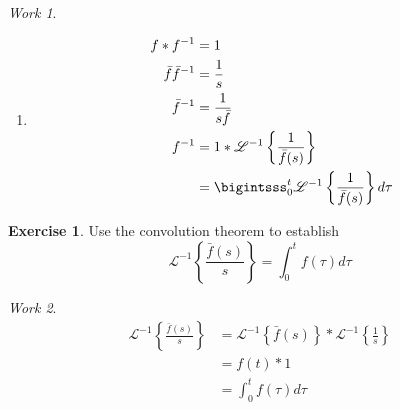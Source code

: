 \documentclass{report}
\theoremstyle{definition}
\newtheorem{exercise}{Exercise}[chapter]
\theoremstyle{remark}
\newtheorem*{work}{Work}
\newcommand{\inlt}[1]{\mathscr{L}^{-1} \left\{ #1 \right\}}
\begin{document}
\begin{work}
\begin{enumerate}[label=(\alph*)]
\begin{proof}
\begin{equation*}
\begin{split}
                &=\int^t_0h(x) (f*g)(x)dx \\
                &=h*(f*g)=(f*g)*h
            \end{split}
        \end{equation*}
        \end{proof}
        \item \begin{equation*}
            \begin{split}
                f*f^{-1}&=1\\
                \bar f \bar f^{-1} &=\frac{1}{s}\\
                \bar f^{-1} &=\frac{1}{s\bar f} \\ 
                f^{-1} &= 1*\inlt{\frac{1}{\bar f(s)}} \\
                &=\bigintsss_0^t\inlt{\frac{1}{\bar f(s)}} d\tau
            \end{split}
        \end{equation*}
    \end{enumerate}
\end{work}

\begin{exercise}
    Use the convolution theorem to establish 
    \begin{equation*}
        \inlt{\frac{\bar f(s)}{s}} = \int^t_0f(\tau)d\tau
    \end{equation*}
\end{exercise}
\begin{work}
    \begin{equation*}
        \begin{split}
            \inlt{\frac{\bar f(s)}{s}} &= \inlt{\bar f(s)} * \inlt{\frac{1}{s}}\\
            &=f(t)*1\\
            &=\int^t_0f(\tau)d\tau
        \end{split}
    \end{equation*}
\end{work}
\end{document}
